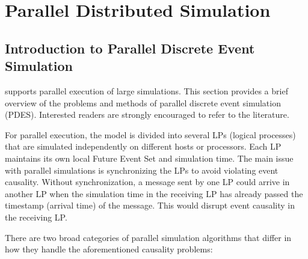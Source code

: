\chapter{Parallel Distributed Simulation}
\label{cha:parallel-exec}


\section{Introduction to Parallel Discrete Event Simulation}
\label{sec:parallel-exec:introduction-to-pdes}

{\opp} supports parallel execution of large
simulations. This section provides a brief overview of the problems and methods
of parallel discrete event simulation (PDES). Interested readers are
strongly encouraged to refer to the literature.

For parallel execution, the model is divided into several LPs (logical
processes) that are simulated independently on different hosts or processors.
Each LP maintains its own local Future Event Set and simulation time. The main
issue with parallel simulations is synchronizing the LPs to avoid violating
event causality. Without synchronization, a message sent by one LP could arrive
in another LP when the simulation time in the receiving LP has already passed
the timestamp (arrival time) of the message. This would disrupt event
causality in the receiving LP.

There are two broad categories of parallel simulation algorithms that differ in
how they handle the aforementioned causality problems:

